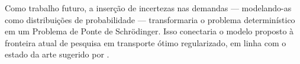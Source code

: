 Como trabalho futuro, a inserção de incertezas nas demandas --- modelando-as como distribuições de probabilidade --- transformaria o problema determinístico em um Problema de Ponte de Schrödinger. Isso conectaria o modelo proposto à fronteira atual de pesquisa em transporte ótimo regularizado, em linha com o estado da arte sugerido por \textcite{mascherpa2023estimating}.